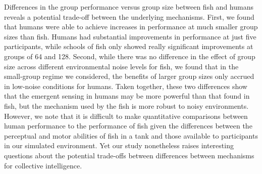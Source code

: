 \documentclass[12pt,letterpaper]{article}
\newcommand{\andrew}[1]{\textcolor{magenta}{\bf [Andrew: #1]}}
\begin{document}
Differences in the group performance versus group size between fish and humans reveals a potential trade-off between the underlying mechanisms. 
First, we found that humans were able to achieve increases in performance at much smaller group sizes than fish. 
Humans had substantial improvements in performance at just five participants, while schools of fish only showed really significant improvements at groups of 64 and 128.  
Second, while there was no difference in the effect of group size across different environmental noise levels for fish, we found that in the small-group regime we considered, the benefits of larger group sizes only accrued in low-noise conditions for humans.
Taken together, these two differences show that the emergent sensing in humans may be more powerful than that found in fish, but the mechanism used by the fish is more robust to noisy environments.
However, we note that it is difficult to make quantitative comparisons between human performance to the performance of fish given the differences between the perceptual and motor abilities of fish in a tank and those available to participants in our simulated environment. Yet our study nonetheless raises interesting questions about the potential trade-offs between differences between mechanisms for collective intelligence.











\end{document}
